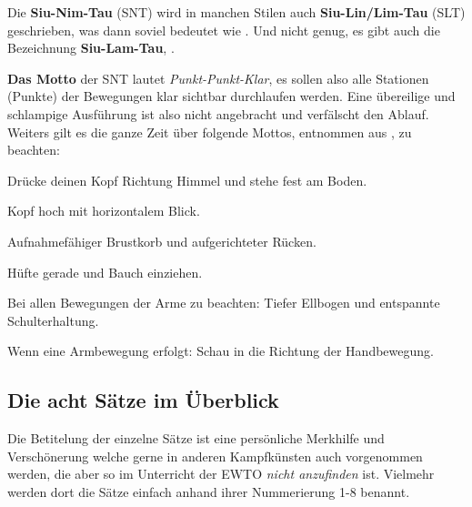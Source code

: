 \begin{WTCommonBegriff}
	Die \textbf{Siu-Nim-Tau} (SNT) wird in manchen Stilen auch \textbf{Siu-Lin/Lim-Tau} (SLT) geschrieben, was dann soviel bedeutet wie . Und nicht genug, es gibt auch die Bezeichnung \textbf{Siu-Lam-Tau}, .
\end{WTCommonBegriff}


\textbf{Das Motto} der SNT lautet \textit{Punkt-Punkt-Klar}, es sollen also alle Stationen (Punkte) der Bewegungen klar sichtbar durchlaufen werden. Eine \"ubereilige und schlampige Ausf\"uhrung ist also nicht angebracht und verf\"alscht den Ablauf. Weiters gilt es die ganze Zeit \"uber folgende Mottos, entnommen aus \cite{WTBIBLeu11}, zu beachten:

\begin{itemizeNarrow}
	\item Dr\"ucke deinen Kopf Richtung Himmel und stehe fest am Boden.
	\item Kopf hoch mit horizontalem Blick.
	\item Aufnahmef\"ahiger Brustkorb und aufgerichteter R\"ucken.
	\item H\"ufte gerade und Bauch einziehen.
	\item Bei allen Bewegungen der Arme zu beachten: Tiefer Ellbogen und entspannte Schulterhaltung.
	\item Wenn eine Armbewegung erfolgt: Schau in die Richtung der Handbewegung.
\end{itemizeNarrow}




\subsection*{Die acht S\"atze im \"Uberblick}

Die Betitelung der einzelne S\"atze ist eine pers\"onliche Merkhilfe und Versch\"onerung welche gerne in anderen Kampfk\"unsten auch vorgenommen werden, die aber so im Unterricht der EWTO \textit{nicht anzufinden} ist. Vielmehr werden dort die S\"atze einfach anhand ihrer Nummerierung 1-8 benannt.

